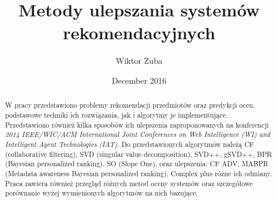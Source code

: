 \documentclass{pracamgr}
\author{Wiktor Zuba}
\title{Metody ulepszania systemów rekomendacyjnych}
\date{December 2016}
\begin{document}
\maketitle

\begin{abstract}
 W pracy przedstawiono problemy rekomendacji przedmiotów oraz predykcji ocen, podstawowe techniki ich rozwiązania, jak i algorytmy je implementujące.
 Przedstawiono również kilka sposobów ich ulepszenia zaproponowanych na konferencji
 \textit{2014 IEEE/WIC/ACM International Joint Conferences on Web Intelligence (WI) and Intelligent Agent Technologies (IAT)}.
 Do przedstawionych algorytmów należą CF (collaborative filtering), SVD (singular value decomposition), SVD++, gSVD++,
 BPR (Bayesian personalized ranking), SO (Slope One), oraz ulepszenia: CF ADV, MABPR (Metadata awareness Bayesian personalized ranking),
 Complex plus różne ich odmiany.
 Praca zawiera również przegląd różnych metod oceny systemów oraz szczegółowe porównanie wyżej wymienionych algorytmów na nich bazujące.
\end{abstract}


\tableofcontents
\end{document}
